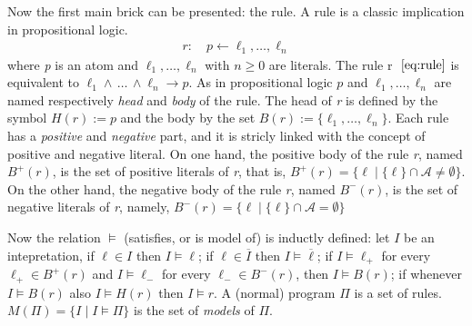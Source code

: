 Now the first main brick can be presented: the rule.
A rule is a classic implication in propositional logic.
\begin{align}\label{eq:rule}
    r: \quad p \leftarrow \ell_1, \ldots, \ell_n
\end{align}
where \textit{p} is an atom and $\ell_1, \ldots, \ell_n$ with $n \ge 0$ are literals.
The rule r  $~\ref{eq:rule}$ is equivalent to $\ell_1 \land\, \ldots \, \land  \ell_n \rightarrow p$.
As in propositional logic $p$ and $\ell_1, \ldots, \ell_n$ are named respectively \textit{head}
and \textit{body} of the rule.
The head of \textit{r} is defined by the symbol $\mathit{H}(r) := p$
and the body by the set
$\mathit{B}(r) := \{\ell_1, \ldots, \ell_n \}$.
Each rule has a \textit{positive} and \textit{negative} part, and it is stricly 
linked with the concept of positive and negative literal.
On one hand, the positive body of the rule \textit{r}, named $\mathit{B}^+(r)$, is the set
of positive literals of \textit{r}, that is, 
$\mathit{B}^+(r) = \{ \ell \mid \{\ell\} \cap \mathcal{A} \ne \emptyset \}$.
On the other hand, the negative body of the rule \textit{r}, named $\mathit{B}^-(r)$, is the set
of negative literals of \textit{r}, namely, 
$\mathit{B}^-(r) = \{ \ell \mid \{\ell\} \cap \mathcal{A} = \emptyset \}$

Now the relation $\models$ (satisfies, or is model of) is inductly 
defined: let $I$ be an intepretation, if $\ell \in I$ then $I \models \ell$;
if $\ell \in \overline{I}$ then $I \models \overline{\ell}$;
if $I \models \ell_+$ for every $\ell_+ \in B^+(r)$ and 
$I \models \ell_-$ for every $\ell_-\in B^-(r)$, then $I \models B(r)$;
if whenever $I \models B(r)$ also $I \models H(r)$ then $I \models r$.
A (normal) program $\Pi$ is a set of rules.
$M(\Pi) = \{ I \mid I \models \Pi\}$ is the set of \textit{models} of $\Pi$. 

